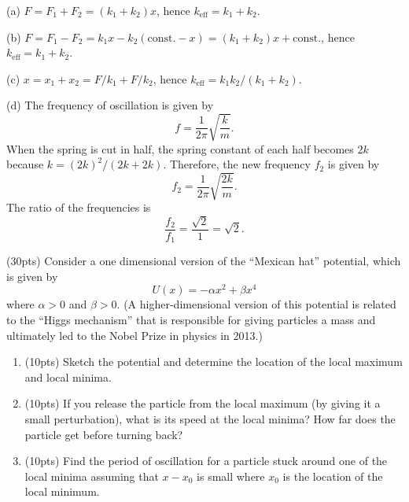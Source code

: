 \documentclass{article}
\begin{document}
\begin{solution}
	(a) \( F=F_1+F_2=(k_1+k_2)x \), hence \( k_\mathrm{eff}=k_1+k_2 \).\par
	(b) \( F=F_1-F_2=k_1x-k_2(\mathrm{const.}-x)=(k_1+k_2)x+\mathrm{const.} \), hence \( k_\mathrm{eff}=k_1+k_2 \).\par
	(c) \( x=x_1+x_2=F/k_1+F/k_2 \), hence \( k_\mathrm{eff}=k_1k_2/(k_1+k_2) \).\par
	(d) The frequency of oscillation is given by 
	\[ f = \frac{1}{2\pi}\sqrt{\frac{k}{m}}. \]
	When the spring is cut in half, the spring constant of each half becomes \( 2k \) because \( k=(2k)^2/(2k+2k) \). Therefore, the new frequency \( f_2 \) is given by
	\[ f_2 = \frac{1}{2\pi}\sqrt{\frac{2k}{m}}. \]
	The ratio of the frequencies is
	\[ \frac{f_2}{f_1} = \frac{\sqrt{2}}{1} = \sqrt{2}. \]
\end{solution}

\begin{problem}
	(30pts) Consider a one dimensional version of the ``Mexican hat'' potential, which is given by
	\[ U(x)=-\alpha x^2+\beta x^4 \]
	where $\alpha>0$ and $\beta>0$. (A higher-dimensional version of this potential is related to the ``Higgs mechanism'' that is responsible for giving particles a mass and ultimately led to the Nobel Prize in physics in 2013.)
	\begin{enumerate}
		\item[(a)] (10pts) Sketch the potential and determine the location of the local maximum and local minima.
		\item[(b)] (10pts) If you release the particle from the local maximum (by giving it a small perturbation), what is its speed at the local minima? How far does the particle get before turning back?
		\item[(c)] (10pts) Find the period of oscillation for a particle stuck around one of the local minima assuming that $x-x_0$ is small where $x_0$ is the location of the local minimum.
	\end{enumerate}
\end{problem}
\end{document}
